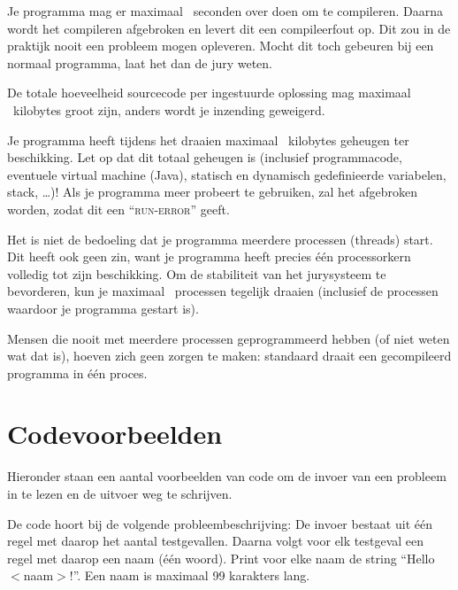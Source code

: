 \begin{description}
\item[compile-tijd]
Je programma mag er maximaal \COMPILETIME\ seconden over doen om te
compileren. Daarna wordt het compileren afgebroken en levert dit een
compileerfout op. Dit zou in de praktijk nooit een probleem mogen
opleveren. Mocht dit toch gebeuren bij een normaal programma, laat het
dan de jury weten.

\item[sourcegrootte]
De totale hoeveelheid sourcecode per ingestuurde oplossing mag
maximaal \SOURCESIZE\ kilobytes groot zijn, anders wordt je
inzending geweigerd.

\item[geheugen]
Je programma heeft tijdens het draaien maximaal \MEMLIMIT\ kilobytes
geheugen ter beschikking. Let op dat dit totaal geheugen is (inclusief
programmacode, eventuele virtual machine (Java), statisch en dynamisch
gedefinieerde variabelen, stack, \dots)! Als je programma meer
probeert te gebruiken, zal het afgebroken worden, zodat dit een
``\textsc{run-error}'' geeft.

\item[aantal processen]
Het is niet de bedoeling dat je programma meerdere processen (threads)
start. Dit heeft ook geen zin, want je programma heeft precies \'e\'en
processorkern volledig tot zijn beschikking. Om de stabiliteit van het
jurysysteem te bevorderen, kun je maximaal \PROCLIMIT\ processen
tegelijk draaien (inclusief de processen waardoor je programma
gestart is).

Mensen die nooit met meerdere processen geprogrammeerd hebben (of
niet weten wat dat is), hoeven zich geen zorgen te maken: standaard
draait een gecompileerd programma in \'e\'en proces.

\end{description}

\newpage
\appendix

\section{Codevoorbeelden}\label{codeexamples}

Hieronder staan een aantal voorbeelden van code om de invoer van een
probleem in te lezen en de uitvoer weg te schrijven.

De code hoort bij de volgende probleembeschrijving:
De invoer bestaat uit \'e\'en regel met daarop het aantal testgevallen.
Daarna volgt voor elk testgeval een regel met daarop een naam (\'e\'en
woord). Print voor elke naam de string ``Hello $<$naam$>$!''. Een naam
is maximaal 99 karakters lang.

